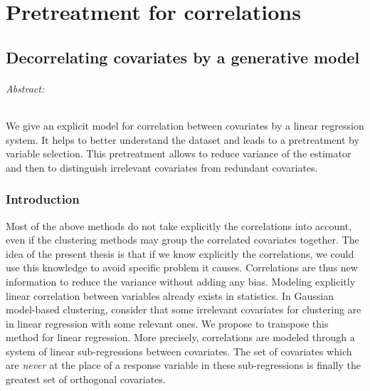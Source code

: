 \documentclass[12pt,a4paper]{report}
\begin{document}
			
\part{Pretreatment for correlations}
\chapter{Decorrelating covariates by a generative model}
\paragraph{Abstract:} 
We give an explicit model for correlation between covariates by a linear regression system. It helps to better understand the dataset and leads to a pretreatment by variable selection. This pretreatment allows to reduce variance of the estimator and then to distinguish irrelevant covariates from redundant covariates.
\\
\section{Introduction}
Most of the above methods do not take explicitly the correlations into account, even if the clustering methods may group the correlated covariates together.
The idea of the present thesis is that if we know explicitly the correlations, we could use this knowledge to avoid specific problem it causes. Correlations are thus new information to reduce the variance without adding any bias. 
Modeling explicitly linear correlation between variables already exists in statistics. In Gaussian model-based clustering, \cite{maugis2009variable} consider that some irrelevant covariates for clustering are in linear regression with some relevant ones.
 We propose to transpose this method for linear regression.
More precisely, correlations are modeled through a system of linear sub-regressions between covariates. The set of covariates which are {\it never} at the place of a response variable in these sub-regressions is finally the greatest set of orthogonal covariates.\\
\end{document}
